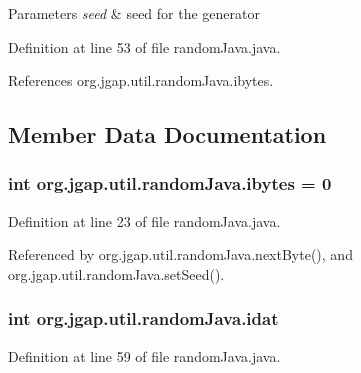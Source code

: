 \begin{DoxyParams}{Parameters}
{\em seed} & seed for the generator \\
\hline
\end{DoxyParams}


Definition at line 53 of file random\-Java.\-java.



References org.\-jgap.\-util.\-random\-Java.\-ibytes.



\subsection{Member Data Documentation}
\hypertarget{classorg_1_1jgap_1_1util_1_1random_java_a588afac9e7879d081e106a722c4873e3}{
\subsubsection[{ibytes}]{\setlength{\rightskip}{0pt plus 5cm}int org.\-jgap.\-util.\-random\-Java.\-ibytes = 0\hspace{0.3cm}{\ttfamily [private]}}}\label{classorg_1_1jgap_1_1util_1_1random_java_a588afac9e7879d081e106a722c4873e3}


Definition at line 23 of file random\-Java.\-java.



Referenced by org.\-jgap.\-util.\-random\-Java.\-next\-Byte(), and org.\-jgap.\-util.\-random\-Java.\-set\-Seed().

\hypertarget{classorg_1_1jgap_1_1util_1_1random_java_af504ca1917505db6cc52398bf05a2a32}{
\subsubsection[{idat}]{\setlength{\rightskip}{0pt plus 5cm}int org.\-jgap.\-util.\-random\-Java.\-idat\hspace{0.3cm}{\ttfamily [private]}}}\label{classorg_1_1jgap_1_1util_1_1random_java_af504ca1917505db6cc52398bf05a2a32}


Definition at line 59 of file random\-Java.\-java.



